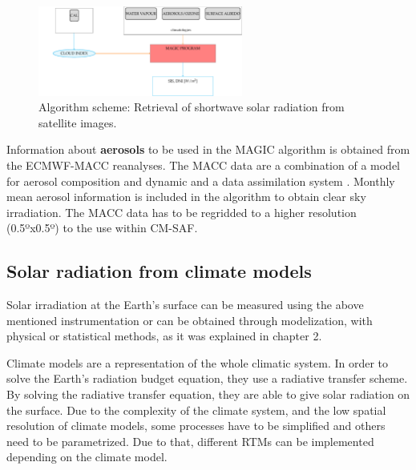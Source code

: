 \begin{figure}
  \centering
  \includegraphics[width=0.6\textwidth]{figs/esquemasat.pdf}
  \caption[Retrieval of solar irradiation from satellites]{Algorithm scheme: Retrieval of shortwave solar radiation from satellite images.}
 \label{fig:algorithm}
\end{figure}

Information about \textbf{aerosols} to be used in the MAGIC algorithm is obtained from the ECMWF-MACC reanalyses. The MACC \cite*{MACC} data are a combination of a model for aerosol composition and dynamic \cite*{Morcrette2009} and a data assimilation system \cite*{Benedetti2009}. Monthly mean aerosol information is included in the algorithm to obtain clear sky irradiation. The MACC data has to be regridded to a higher resolution (0.5ºx0.5º) to the use within CM-SAF.


\subsection{Solar radiation from climate models}%


Solar irradiation at the Earth's surface can be measured using the above mentioned instrumentation or can be obtained through modelization, with physical or statistical methods, as it was explained in chapter 2.

Climate models are a representation of the whole climatic system. In order to solve the Earth's radiation budget equation, they use a radiative transfer scheme. By solving the radiative transfer equation, they are able to give solar radiation on the surface. Due to the complexity of the climate system, and the low spatial resolution of climate models, some processes have to be simplified and others need to be parametrized. Due to that, different RTMs can be implemented depending on the climate model.

